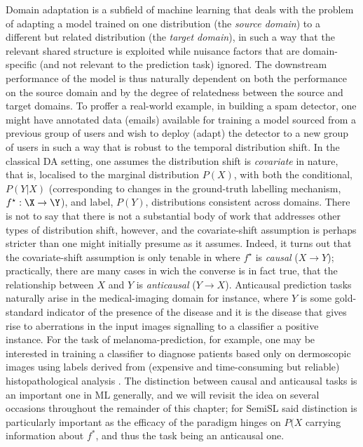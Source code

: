 Domain adaptation is a subfield of machine learning that deals with the problem of adapting a model
trained on one distribution (the \emph{source domain}) to a different but related distribution (the
\emph{target domain}), in such a way that the relevant shared structure is exploited while nuisance
factors that are domain-specific (and not relevant to the prediction task) ignored.
%
The downstream performance of the  model is thus naturally dependent on both the performance on the
source domain and by the degree of relatedness between the source and target domains.
%
To proffer a real-world example, in building a spam detector, one might have annotated data
(emails) available for training a model sourced from a previous group of users and wish to deploy
(adapt) the detector to a new group of users in such a way that is robust to the temporal
distribution shift.
%
In the classical DA setting, one assumes the distribution shift is \emph{covariate}
\cite{david2010impossibility} in nature, that is, localised to the marginal distribution
\(P(X)\), with both the conditional, \(P(Y|X)\) (corresponding to changes in the ground-truth
labelling mechanism, \(f^\star: \X \to \Y \)), and label, \(P(Y)\), distributions consistent across
domains.
%
There is not to say that there is not a substantial body of work that addresses other types
of distribution shift, however\citep{zhao2019learning}, and the covariate-shift assumption is
perhaps stricter than one might initially presume as it assumes.
%
Indeed, it turns out that the covariate-shift assumption is only tenable in  where \(f^\star\) is
\emph{causal} (\(X \to Y\)); practically, there are many cases in wich the converse is in fact
true, that the relationship between \(X\) and \(Y\) is \emph{anticausal} (\(Y \to X\)).
%
Anticausal prediction tasks naturally arise in the medical-imaging domain for instance, where \(Y\)
is some gold-standard indicator of the presence of the disease and it is the disease that gives
rise to aberrations in the input images signalling to a classifier a positive instance. 
%
For the task of melanoma-prediction, for example, one may be interested in training a classifier to
diagnose patients based only on dermoscopic images using labels derived from (expensive and
time-consuming but reliable) histopathological analysis \citep{castro2020causality}.
%
The distinction between causal and anticausal tasks is an important one in ML generally, and we
will revisit the idea on several occasions throughout the remainder of this chapter; for SemiSL
said distinction is particularly important as the efficacy of the paradigm hinges on \(P(X\)
carrying information about \(f^\ast\), and thus the task being an anticausal one.
%

